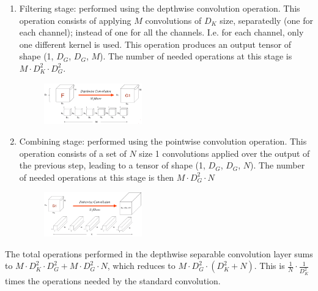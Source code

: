 \documentclass[10pt,a4paper]{article}
\begin{document}
\begin{enumerate}
\item Filtering stage: performed using the depthwise convolution operation. This operation consists of applying $M$ convolutions of $D_K$ size, separatedly (one for each channel); instead of one for all the channels. I.e. for each channel, only one different kernel is used. This operation produces an output tensor of shape (1, $D_G$, $D_G$, $M$). The number of needed operations at this stage is $M \cdot D_K^2 \cdot D_G^2$.
\begin{figure}[h!]
	\centering
	\includegraphics[width=0.4\textwidth]{img/dw_conv.png}
\end{figure}
\item Combining stage: performed using the pointwise convolution operation. This operation consists of a set of $N$ size 1 convolutions applied over the output of the previous step, leading to a tensor of shape (1, $D_G$, $D_G$, $N$). The number of needed operations at this stage is then $M \cdot D_G^2 \cdot N$
\begin{figure}[h!]
	\centering
	\includegraphics[width=0.4\textwidth]{img/pw_conv.png}
\end{figure}
\end{enumerate} 




The total operations performed in the depthwise separable convolution layer sums to $M \cdot D_K^2 \cdot D_G^2 + M \cdot D_G^2 \cdot N$, which reduces to $M \cdot D_G^2 \cdot \left(D_K^2 + N\right)$. This is $\frac{1}{N}\cdot\frac{1}{D_K^2}$ times the operations needed by the standard convolution. 
\end{document}
